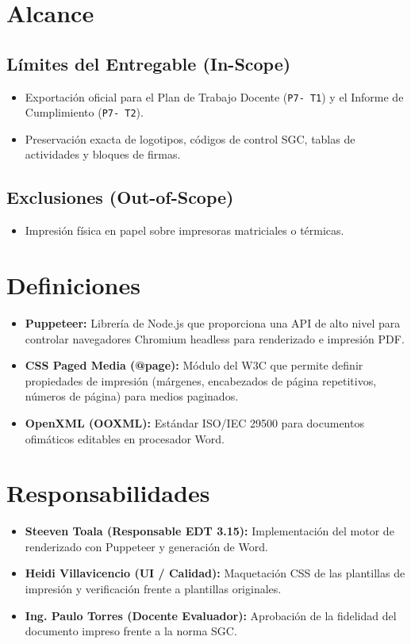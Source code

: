 \documentclass[12pt,a4paper]{article}
\begin{document}
\section{Alcance}
\subsection{Límites del Entregable (In-Scope)}
\begin{itemize}[leftmargin=1.5em, itemsep=2pt]
    \item Exportación oficial para el Plan de Trabajo Docente (\texttt{P7- T1}) y el Informe de Cumplimiento (\texttt{P7- T2}).
    \item Preservación exacta de logotipos, códigos de control SGC, tablas de actividades y bloques de firmas.
\end{itemize}
\subsection{Exclusiones (Out-of-Scope)}
\begin{itemize}[leftmargin=1.5em, itemsep=2pt]
    \item Impresión física en papel sobre impresoras matriciales o térmicas.
\end{itemize}

\section{Definiciones}
\begin{itemize}[leftmargin=1.5em, itemsep=2pt]
    \item \textbf{Puppeteer:} Librería de Node.js que proporciona una API de alto nivel para controlar navegadores Chromium headless para renderizado e impresión PDF.
    \item \textbf{CSS Paged Media (@page):} Módulo del W3C que permite definir propiedades de impresión (márgenes, encabezados de página repetitivos, números de página) para medios paginados.
    \item \textbf{OpenXML (OOXML):} Estándar ISO/IEC 29500 para documentos ofimáticos editables en procesador Word.
\end{itemize}

\section{Responsabilidades}
\begin{itemize}[leftmargin=1.5em, itemsep=2pt]
    \item \textbf{Steeven Toala (Responsable EDT 3.15):} Implementación del motor de renderizado con Puppeteer y generación de Word.
    \item \textbf{Heidi Villavicencio (UI / Calidad):} Maquetación CSS de las plantillas de impresión y verificación frente a plantillas originales.
    \item \textbf{Ing. Paulo Torres (Docente Evaluador):} Aprobación de la fidelidad del documento impreso frente a la norma SGC.
\end{itemize}
\end{document}
